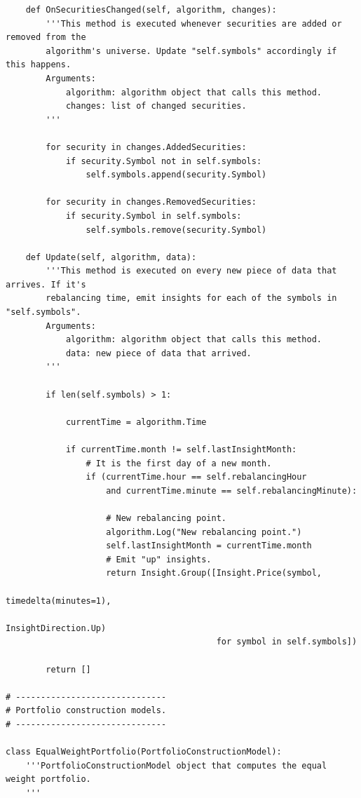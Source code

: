 \begin{verbatim}
    def OnSecuritiesChanged(self, algorithm, changes):
        '''This method is executed whenever securities are added or removed from the
        algorithm's universe. Update "self.symbols" accordingly if this happens.
        Arguments:
            algorithm: algorithm object that calls this method.
            changes: list of changed securities.
        '''
        
        for security in changes.AddedSecurities:
            if security.Symbol not in self.symbols:
                self.symbols.append(security.Symbol)
                
        for security in changes.RemovedSecurities:
            if security.Symbol in self.symbols:
                self.symbols.remove(security.Symbol)
                
    def Update(self, algorithm, data):
        '''This method is executed on every new piece of data that arrives. If it's
        rebalancing time, emit insights for each of the symbols in "self.symbols".
        Arguments:
            algorithm: algorithm object that calls this method.
            data: new piece of data that arrived.
        '''
        
        if len(self.symbols) > 1:
        
            currentTime = algorithm.Time
            
            if currentTime.month != self.lastInsightMonth:
                # It is the first day of a new month.
                if (currentTime.hour == self.rebalancingHour
                    and currentTime.minute == self.rebalancingMinute):
                       
                    # New rebalancing point.
                    algorithm.Log("New rebalancing point.")
                    self.lastInsightMonth = currentTime.month
                    # Emit "up" insights.
                    return Insight.Group([Insight.Price(symbol,
                                                        timedelta(minutes=1),
                                                        InsightDirection.Up)
                                          for symbol in self.symbols])
        
        return []
        
# ------------------------------
# Portfolio construction models.
# ------------------------------
        
class EqualWeightPortfolio(PortfolioConstructionModel):
    '''PortfolioConstructionModel object that computes the equal weight portfolio.
    '''
        

\end{verbatim}
